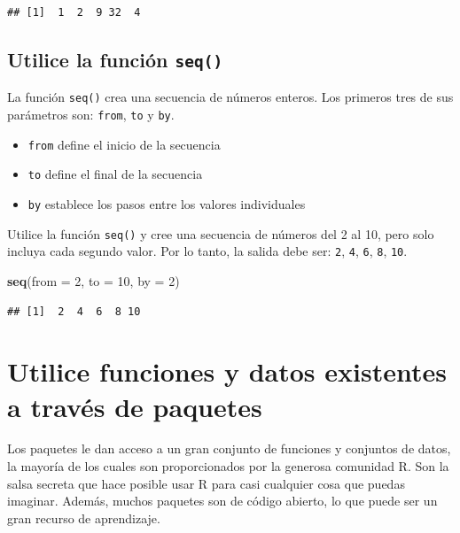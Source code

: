 \documentclass[
]{book}
\newenvironment{Shaded}{\begin{snugshade}}{\end{snugshade}}
\newcommand{\DataTypeTok}[1]{\textcolor[rgb]{0.13,0.29,0.53}{#1}}
\newcommand{\DecValTok}[1]{\textcolor[rgb]{0.00,0.00,0.81}{#1}}
\newcommand{\KeywordTok}[1]{\textcolor[rgb]{0.13,0.29,0.53}{\textbf{#1}}}
\newcommand{\NormalTok}[1]{#1}
\providecommand{\tightlist}{%
  \setlength{\itemsep}{0pt}\setlength{\parskip}{0pt}}
\begin{document}
\begin{verbatim}
## [1]  1  2  9 32  4
\end{verbatim}

\hypertarget{utilice-la-funciuxf3n-seq}{%
\subsection{\texorpdfstring{Utilice la función \texttt{seq()}}{Utilice la función seq()}}\label{utilice-la-funciuxf3n-seq}}

La función \texttt{seq()} crea una secuencia de números enteros. Los primeros tres de sus parámetros son: \texttt{from}, \texttt{to} y \texttt{by}.

\begin{itemize}
\tightlist
\item
  \texttt{from} define el inicio de la secuencia
\item
  \texttt{to} define el final de la secuencia
\item
  \texttt{by} establece los pasos entre los valores individuales
\end{itemize}

Utilice la función \texttt{seq()} y cree una secuencia de números del 2 al 10, pero solo incluya cada segundo valor. Por lo tanto, la salida debe ser: \texttt{2}, \texttt{4}, \texttt{6}, \texttt{8}, \texttt{10}.

\begin{Shaded}
\begin{Highlighting}[]
\KeywordTok{seq}\NormalTok{(}\DataTypeTok{from =} \DecValTok{2}\NormalTok{, }\DataTypeTok{to =} \DecValTok{10}\NormalTok{, }\DataTypeTok{by =} \DecValTok{2}\NormalTok{)}
\end{Highlighting}
\end{Shaded}

\begin{verbatim}
## [1]  2  4  6  8 10
\end{verbatim}

\hypertarget{utilice-funciones-y-datos-existentes-a-travuxe9s-de-paquetes}{%
\section{Utilice funciones y datos existentes a través de paquetes}\label{utilice-funciones-y-datos-existentes-a-travuxe9s-de-paquetes}}

Los paquetes le dan acceso a un gran conjunto de funciones y conjuntos de datos, la mayoría de los cuales son proporcionados por la generosa comunidad R. Son la salsa secreta que hace posible usar R para casi cualquier cosa que puedas imaginar. Además, muchos paquetes son de código abierto, lo que puede ser un gran recurso de aprendizaje.
\end{document}
